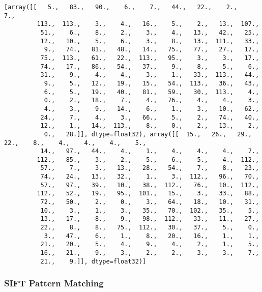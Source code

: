 \documentclass[11pt]{article}
\begin{document}
    \begin{Verbatim}[commandchars=\\\{\}]
[array([[   5.,   83.,   90.,    6.,    7.,   44.,   22.,    2.,    7.,
         113.,  113.,    3.,    4.,   16.,    5.,    2.,   13.,  107.,
          51.,    6.,    8.,    2.,    3.,    4.,   13.,   42.,   25.,
          12.,   10.,    5.,    6.,    3.,    8.,   13.,  111.,   33.,
           9.,   74.,   81.,   48.,   14.,   75.,   77.,   27.,   17.,
          75.,  113.,   61.,   22.,  113.,   95.,    3.,    3.,   17.,
          74.,   17.,   86.,   54.,   37.,    9.,    8.,    5.,    6.,
          31.,    9.,    4.,    4.,    3.,    1.,   33.,  113.,   44.,
           9.,    5.,   12.,   19.,   15.,   54.,  113.,   36.,   43.,
           6.,    5.,   19.,   40.,   81.,   59.,   30.,  113.,    4.,
           0.,    2.,   18.,    7.,    4.,   76.,    4.,    4.,    3.,
           4.,    3.,    9.,   14.,    6.,    1.,    3.,   10.,   62.,
          24.,    7.,    4.,    3.,   66.,    5.,    2.,   74.,   40.,
          12.,    1.,   14.,  113.,    8.,    0.,    2.,   13.,    2.,
           0.,   28.]], dtype=float32), array([[  15.,   26.,   29.,   22.,    8.,    4.,    4.,    4.,    5.,
          14.,   97.,   44.,    4.,    1.,    4.,    4.,    4.,    7.,
         112.,   85.,    3.,    2.,    5.,    6.,    5.,    4.,  112.,
          57.,    7.,    3.,   13.,   28.,   54.,    7.,    8.,   23.,
          74.,   24.,   13.,   32.,    1.,    3.,  112.,   96.,   70.,
          57.,   97.,   39.,   10.,   38.,  112.,   76.,   10.,  112.,
         112.,   52.,   19.,   95.,  101.,   15.,    3.,   33.,   88.,
          72.,   50.,    2.,    0.,    3.,   64.,   18.,   10.,   31.,
          10.,    3.,    1.,    3.,   35.,   70.,  102.,   35.,    5.,
          13.,   17.,    8.,    9.,   98.,  112.,   33.,   11.,   27.,
          22.,    8.,    8.,   75.,  112.,   30.,   37.,    5.,    0.,
           3.,   47.,    6.,    1.,    8.,   20.,   16.,    1.,    1.,
          21.,   20.,    5.,    4.,    9.,    4.,    2.,    1.,    5.,
          16.,   21.,    9.,    3.,    2.,    2.,    3.,    3.,    7.,
          21.,    9.]], dtype=float32)]

    \end{Verbatim}

    \hypertarget{sift-pattern-matching}{%
\subsubsection{SIFT Pattern Matching}\label{sift-pattern-matching}}
\end{document}
